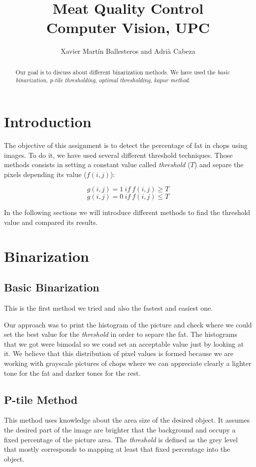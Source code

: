 \documentclass[12]{article}
\author{Xavier Martín Ballesteros and Adrià Cabeza}
\title{Meat Quality Control \\ \large{Computer Vision, UPC}}
\begin{document}
\maketitle
  \vspace{1cm}
	\begin{abstract}
Our goal is to discuss about different binarization methods. We have used the \textit{basic binarization}, \textit{p-tile thresholding}, \textit{optimal thresholding}, \textit{kapur method}.
\end{abstract}

\newpage
\tableofcontents
\section{Introduction}
The objective of this assignment is to detect the percentage of fat in chops using images. To do it, we have used several different threshold techniques. Those methods consists in setting a constant value called \textit{threshold} ($T$) and separe the pixels depending its value ($ f(i,j)$):
\vspace{-0.6cm}
\begin{center}
$$ g(i,j)=1\ if\ f(i,j) \geq T$$ 
$$ g(i,j)=0\ if\ f(i,j) \leq T$$
\end{center}

In the following sections we will introduce different methods to find the threshold value and compared its results. 

\section{Binarization}
\subsection{Basic Binarization}
This is the first method we tried and also the fastest and easiest one. 

\noindent Our approach was to print the histogram of the picture and check where we could set the best value for the \textit{threshold} in order to separe the fat. The histograms that we got were bimodal so we coud set an acceptable value just by looking at it. We believe that this distribution of pixel values is formed because we are working with grayscale pictures of chops where we can appreciate clearly a lighter tone for the fat and darker tones for the rest.
\subsection{P-tile Method}
This method uses knowledge about the area size of the desired object. It assumes the desired part of the image are brighter that the background and occupy a fixed percentage of the picture area. The \textit{threshold} is defined as the grey level that mostly corresponds to mapping at least that fixed percentage into the object. 
\end{document}

